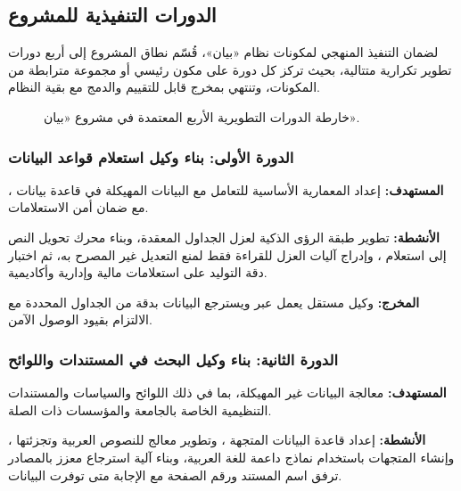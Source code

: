 \subsection{الدورات التنفيذية للمشروع}
\label{subsec:project-sprints}

لضمان التنفيذ المنهجي لمكونات نظام «بيان»، قُسّم نطاق المشروع إلى أربع دورات
تطوير تكرارية متتالية، بحيث تركز كل دورة على مكون رئيسي أو مجموعة مترابطة من
المكونات، وتنتهي بمخرج قابل للتقييم والدمج مع بقية النظام.

\begin{figure}[htbp]
  \centering
  \resizebox{0.91\textwidth}{!}{}
  \caption{خارطة الدورات التطويرية الأربع المعتمدة في مشروع «بيان».}
  \label{fig:project-sprints}
\end{figure}

\subsubsection{الدورة الأولى: بناء وكيل استعلام قواعد البيانات}
\label{subsubsec:sprint-one}

\textbf{المستهدف:} إعداد المعمارية الأساسية للتعامل مع البيانات المهيكلة في
قاعدة بيانات ، مع ضمان أمن الاستعلامات.

\textbf{الأنشطة:} تطوير طبقة الرؤى الذكية  لعزل الجداول
المعقدة، وبناء محرك تحويل النص إلى استعلام ، وإدراج آليات
العزل للقراءة فقط  لمنع التعديل غير المصرح به، ثم
اختبار دقة التوليد على استعلامات مالية وإدارية وأكاديمية.

\textbf{المخرج:} وكيل  مستقل يعمل عبر  ويسترجع البيانات
بدقة من الجداول المحددة مع الالتزام بقيود الوصول الآمن.

\subsubsection{الدورة الثانية: بناء وكيل البحث في المستندات واللوائح}
\label{subsubsec:sprint-two}

\textbf{المستهدف:} معالجة البيانات غير المهيكلة، بما في ذلك اللوائح والسياسات
والمستندات التنظيمية الخاصة بالجامعة والمؤسسات ذات الصلة.

\textbf{الأنشطة:} إعداد قاعدة البيانات المتجهة ، وتطوير
معالج للنصوص العربية وتجزئتها ، وإنشاء المتجهات
 باستخدام نماذج داعمة للغة العربية، وبناء آلية استرجاع معزز
بالمصادر ترفق اسم المستند ورقم الصفحة مع الإجابة متى توفرت البيانات.

